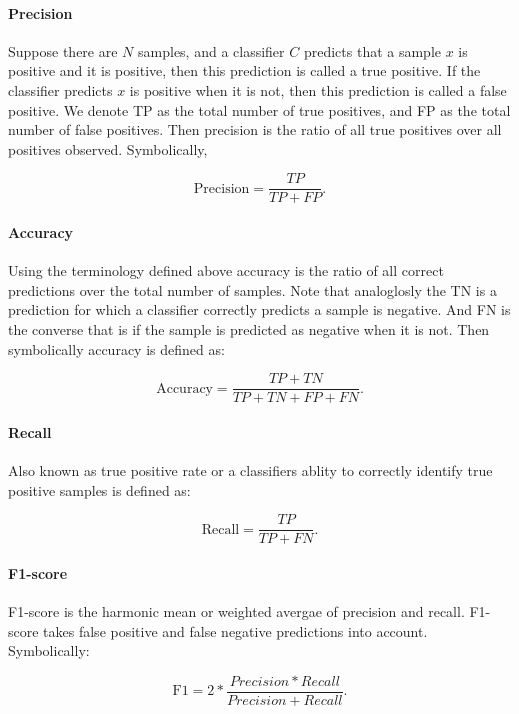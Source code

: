 \paragraph{Precision}
Suppose there are $N$ samples, and a classifier $C$ predicts that a sample $x$ is positive and it is positive, then this prediction is called a true positive. If the classifier predicts $x$ is positive when it is not, then this prediction is called a false positive. We denote TP as the total number of true positives, and FP as the total number of false positives. Then precision is the ratio of all true positives over all positives observed. Symbolically,

\begin{equation}
	\text{Precision} = \frac{TP}{TP + FP}.
\end{equation}

\paragraph{Accuracy}
Using the terminology defined above accuracy is the ratio of all correct predictions over the total number of samples. Note that analoglosly the TN is a prediction for which a classifier correctly predicts a sample is negative. And FN is the converse that is if the sample is predicted as negative when it is not. Then symbolically accuracy is defined as: 

\begin{equation}
	\text{Accuracy} = \frac{TP + TN}{TP + TN + FP + FN}.
\end{equation}

\paragraph{Recall}
Also known as true positive rate or a classifiers ablity to correctly identify true positive samples is defined as:

\begin{equation}
	\text{Recall} = \frac{TP}{TP +  FN}.
\end{equation}

\paragraph{F1-score}
F1-score is the harmonic mean or weighted avergae of precision and recall. F1-score takes false positive and false negative predictions into account. Symbolically:

\begin{equation}
	\text{F1} = 2* \frac{Precision  * Recall}{Precision +  Recall}.
\end{equation}